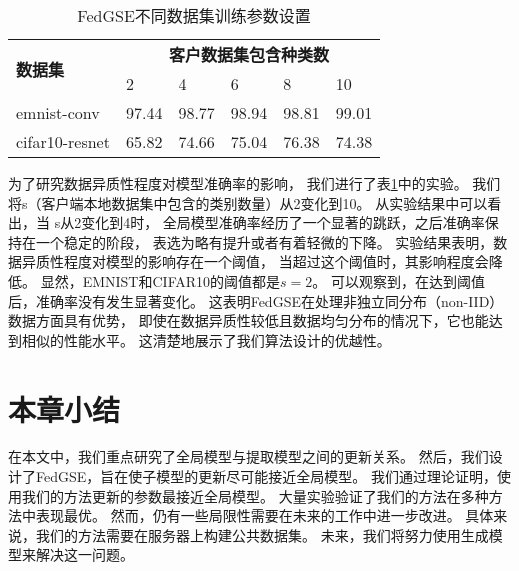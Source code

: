 \begin{table}[thbp]
    \caption{\label{tab:clientDataDis}FedGSE不同数据集训练参数设置}
    \begin{tabularx}{\linewidth}{l X<{\centering} X<{\centering} X<{\centering} X<{\centering} X<{\centering}}
        \toprule
        \multirow{2}{*}{\textbf{数据集}} & \multicolumn{5}{c}{\textbf{客户数据集包含种类数}} \\ \cline{2-6}
        & 2 & 4 & 6 & 8 & 10\\
        \midrule
        emnist-conv & 97.44 & 98.77 & 98.94 & 98.81 & 99.01 \\
        cifar10-resnet & 65.82 & 74.66 & 75.04 & 76.38 & 74.38 \\
        \bottomrule
    \end{tabularx}
\end{table}
为了研究数据异质性程度对模型准确率的影响，
我们进行了表\ref{tab:clientDataDis}中的实验。
我们将s（客户端本地数据集中包含的类别数量）从2变化到10。
从实验结果中可以看出，当
s从2变化到4时，
全局模型准确率经历了一个显著的跳跃，之后准确率保持在一个稳定的阶段，
表选为略有提升或者有着轻微的下降。
实验结果表明，数据异质性程度对模型的影响存在一个阈值，
当超过这个阈值时，其影响程度会降低。
显然，EMNIST和CIFAR10的阈值都是$s=2$。
可以观察到，在达到阈值后，准确率没有发生显著变化。
这表明FedGSE在处理非独立同分布（non-IID）数据方面具有优势，
即使在数据异质性较低且数据均匀分布的情况下，它也能达到相似的性能水平。
这清楚地展示了我们算法设计的优越性。

\section{本章小结}
在本文中，我们重点研究了全局模型与提取模型之间的更新关系。
然后，我们设计了FedGSE，旨在使子模型的更新尽可能接近全局模型。
我们通过理论证明，使用我们的方法更新的参数最接近全局模型。
大量实验验证了我们的方法在多种方法中表现最优。
然而，仍有一些局限性需要在未来的工作中进一步改进。
具体来说，我们的方法需要在服务器上构建公共数据集。
未来，我们将努力使用生成模型来解决这一问题。